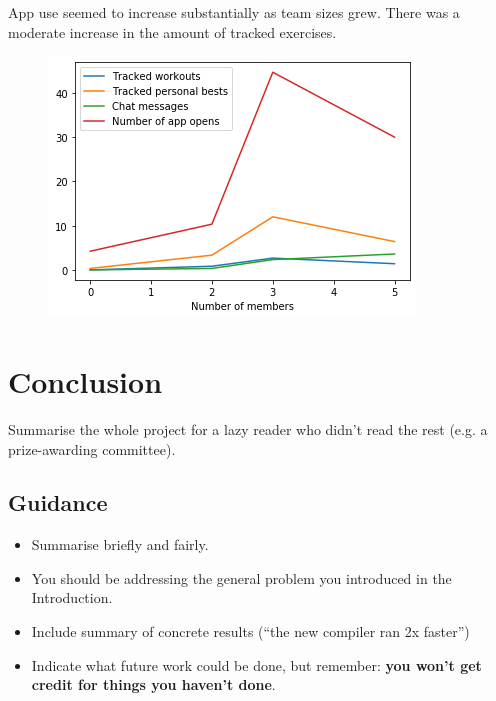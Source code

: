 \documentclass{l4proj}
\begin{document}
App use seemed to increase substantially as team sizes grew. There was a moderate increase in the amount of tracked exercises.
\begin{figure}[H]
    \centering
    \includegraphics[width=1.0\linewidth]{data/activity.png}    
    \label{fig:exercises} 
\end{figure}


\chapter{Conclusion}    
Summarise the whole project for a lazy reader who didn't read the rest (e.g. a prize-awarding committee).
\section{Guidance}
\begin{itemize}
    \item
        Summarise briefly and fairly.
    \item
        You should be addressing the general problem you introduced in the
        Introduction.        
    \item
        Include summary of concrete results (``the new compiler ran 2x
        faster'')
    \item
        Indicate what future work could be done, but remember: \textbf{you
        won't get credit for things you haven't done}.
\end{itemize}





\end{document}
